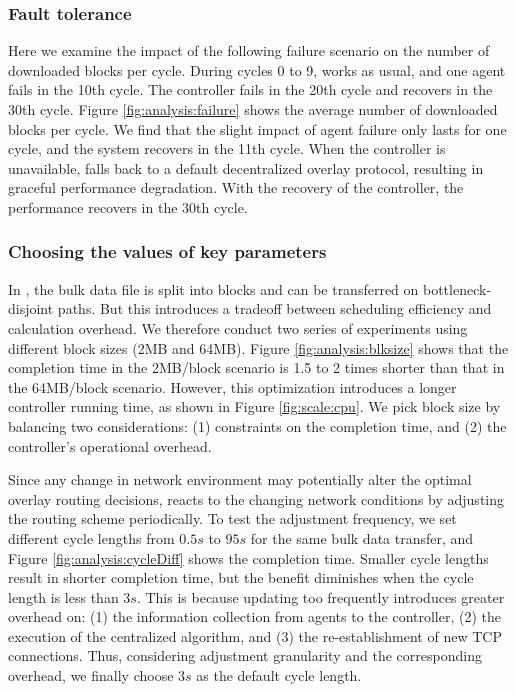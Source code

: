 \subsubsection{Fault tolerance}

Here we examine the impact of the following failure scenario on the number of downloaded blocks per cycle. During cycles 0 to 9, \name works as usual, and one agent fails in the 10th cycle. The controller fails in the 20th cycle and recovers in the 30th cycle. Figure \ref{fig:analysis:failure} shows the average number of downloaded blocks per cycle. We find that the slight impact of agent failure only lasts for one cycle, and the system recovers in the 11th cycle. When the controller is unavailable, \name falls back to a default decentralized overlay protocol, resulting in graceful performance degradation. With the recovery of the controller, the performance recovers in the 30th cycle.

\subsubsection{Choosing the values of key parameters}
\label{subsec:evaluation:benchmarks:parameters}

 In \name, the bulk data file is split into blocks and can be transferred on bottleneck-disjoint paths. But this introduces a tradeoff between scheduling efficiency and calculation overhead. We therefore conduct two series of experiments using different block sizes (2MB and 64MB). Figure \ref{fig:analysis:blksize} shows that the completion time in the 2MB/block scenario is 1.5 to 2 times shorter than that in the 64MB/block scenario.
However, this optimization introduces a longer controller running time, as shown in Figure \ref{fig:scale:cpu}. We pick block size by balancing two considerations: (1) constraints on the completion time, and (2) the controller's operational overhead.

 Since any change in network environment may potentially alter the optimal overlay routing decisions, \name reacts to the changing network conditions by adjusting the routing scheme periodically. To test the adjustment frequency, we set different cycle lengths from $0.5s$ to $95s$ for the same bulk data transfer, and Figure \ref{fig:analysis:cycleDiff} shows the completion time. Smaller cycle lengths result in shorter completion time, but the benefit diminishes when the cycle length is less than $3s$. This is because updating too frequently introduces greater overhead on: (1) the information collection from agents to the controller, (2) the execution of the centralized algorithm, and (3) the re-establishment of new TCP connections. Thus, considering adjustment granularity and the corresponding overhead, we finally choose $3s$ as the default cycle length.


